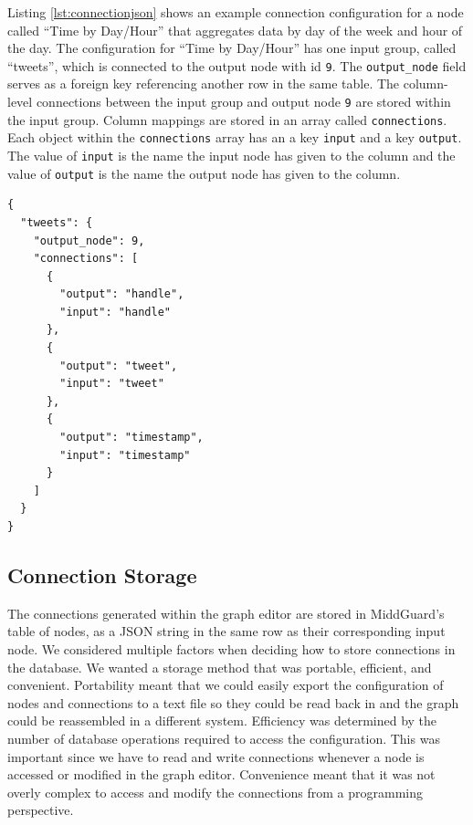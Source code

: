 \documentclass[midd]{thesis}
\begin{document}
Listing \ref{lst:connectionjson} shows an example connection configuration for a
node called ``Time by Day/Hour'' that aggregates data by day of the week and
hour of the day. The configuration for ``Time by Day/Hour'' has one input group,
called ``tweets'', which is connected to the output node with id \texttt{9}. The
\texttt{output\_node} field serves as a foreign key referencing another row in
the same table. The column-level connections between the input group and output
node \texttt{9} are stored within the input group. Column mappings are stored in
an array called \texttt{connections}. Each object within the
\texttt{connections} array has an a key \texttt{input} and a key
\texttt{output}. The value of \texttt{input} is the name the input node has
given to the column and the value of \texttt{output} is the name the output node
has given to the column.

\begin{lstlisting}[caption={A node's connection configuration. The node has a connection from its input group ``tweets'' to the node with id 9.}, captionpos=b, label={lst:connectionjson}]
{
  "tweets": {
    "output_node": 9,
    "connections": [
      {
        "output": "handle",
        "input": "handle"
      },
      {
        "output": "tweet",
        "input": "tweet"
      },
      {
        "output": "timestamp",
        "input": "timestamp"
      }
    ]
  }
}
\end{lstlisting}

\subsection{Connection Storage}

The connections generated within the graph editor are stored in MiddGuard's
table of nodes, as a JSON string in the same row as their corresponding input
node. We considered multiple factors when deciding how to store connections in
the database. We wanted a storage method that was portable, efficient, and
convenient. Portability meant that we could easily export the configuration of
nodes and connections to a text file so they could be read back in and the graph
could be reassembled in a different system. Efficiency was determined by the
number of database operations required to access the configuration. This was
important since we have to read and write connections whenever a node is
accessed or modified in the graph editor. Convenience meant that it was not
overly complex to access and modify the connections from a programming
perspective.
\end{document}
